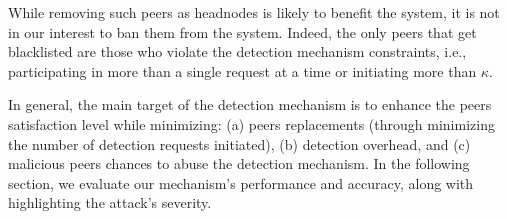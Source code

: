 While removing such peers as headnodes is likely to benefit the system, it is not in our interest to ban them from the system. 
Indeed, the only peers that get blacklisted are those who violate the detection mechanism constraints, i.e., participating in more than a single request at a time or initiating more than $\kappa$.

In general, the main target of the detection mechanism is to enhance the peers satisfaction level while minimizing: (a) peers replacements (through minimizing the number of detection requests initiated), (b) detection overhead, and (c) malicious peers chances to abuse the detection mechanism.
In the following section, we evaluate our mechanism's performance and accuracy, along with highlighting the attack's severity.





